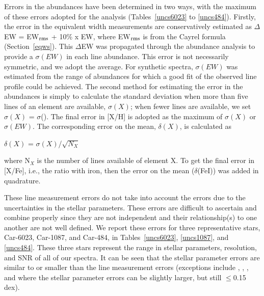 \documentclass{emulateapj}
\newcommand\teff{T$_{\rm eff}$}
\newcommand\logg{log\,{\it g}}
\begin{document}
Errors in the abundances have been determined in two ways,
with the maximum of these errors adopted for the analysis 
(Tables~\ref{uncs6023} to \ref{uncs484}).
%
Firstly, the error in the equivalent width measurements are 
conservatively estimated as
$\Delta$EW = EW$_{\rm rms}$ +  10\% x EW, where
EW$_{\rm rms}$ is from the Cayrel formula (Section~\ref{eqws}).   
This $\Delta$EW was propagated through the abundance analysis
to provide a $\sigma(EW)$ in each line abundance.
This error is not necessarily symmetric, and we adopt the average.   
For synthetic spectra, $\sigma(EW)$ was estimated from the range 
of abundances for which a good fit of the observed line profile 
could be achieved.
%
The second method for estimating the error in the abundances is 
simply to calculate the standard deviation when more than five 
lines of an element are available, $\sigma(X)$;  
when fewer lines are available, 
we set $\sigma(X)$ = $\sigma$().
%
The final error in [X/H] is adopted as the maximum of
$\sigma(X)$ or $\sigma(EW)$.  
%
The corresponding error on the mean, $\delta(X)$, 
is calculated as 

\vspace{0.1in}
$\delta(X)$ = $\sigma(X)$/$\sqrt{N_X}$

\vspace{0.1in}
\noindent where N$_X$ is the number of lines available
of element X.
%
To get the final error in [X/Fe], i.e., the ratio with iron, then
the error on the mean ($\delta$(FeI)) was added in quadrature.


These line measurement errors do not take into account the errors 
due to the uncertainties in the stellar parameters.   These 
errors are difficult to ascertain and combine properly since they 
are not independent and their relationship(s) to one another are not 
well defined.  We report these errors 
for three representative stars, 
Car-6023, Car-1087, and Car-484, 
in Tables~\ref{uncs6023}, \ref{uncs1087}, and \ref{uncs484}.
These three stars represent the range in stellar parameters,
resolution, and SNR of all of our spectra.   It can be seen
that the stellar parameter errors are similar to or smaller 
than the line measurement errors 
(exceptions include , , , and 
where the stellar parameter errors can be slightly larger, but still 
$\le$0.15 dex).
\end{document}
